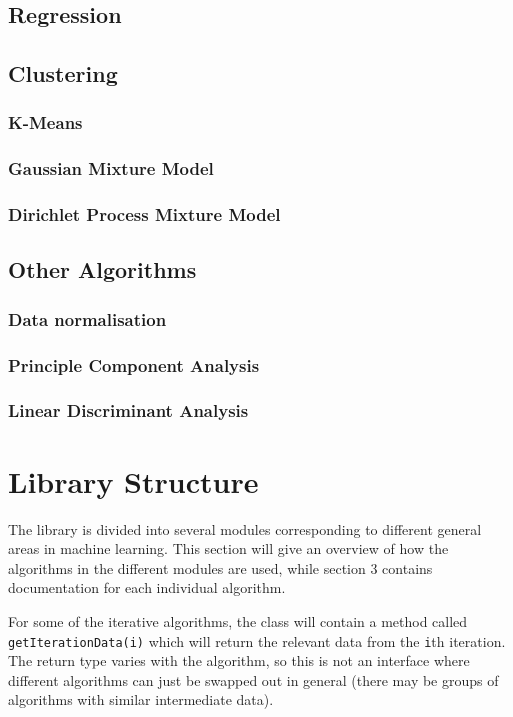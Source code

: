 \documentclass[a4paper]{article}
\begin{document}
\subsection{Regression}


\subsection{Clustering}
\subsubsection{K-Means}

\subsubsection{Gaussian Mixture Model}

\subsubsection{Dirichlet Process Mixture Model}


\subsection{Other Algorithms}
\subsubsection{Data normalisation}

\subsubsection{Principle Component Analysis}

\subsubsection{Linear Discriminant Analysis}


\section{Library Structure}
The library is divided into several modules corresponding to different general areas in machine learning. This section will give an overview of how the algorithms in the different modules are used, while section 3 contains documentation for each individual algorithm.

For some of the iterative algorithms, the class will contain a method called \texttt{getIterationData(i)} which will return the relevant data from the \texttt{i}th iteration. The return type varies with the algorithm, so this is not an interface where different algorithms can just be swapped out in general (there may be groups of algorithms with similar intermediate data).
\end{document}
